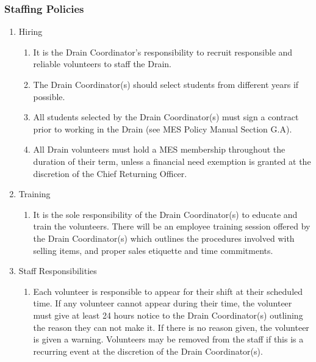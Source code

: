 \subsubsection{Staffing Policies}
\label{staffing-policies}

\begin{enumerate}
 \item
  Hiring

  \begin{enumerate}
   \item
    It is the Drain Coordinator's responsibility to recruit responsible and reliable volunteers to staff the Drain.
   \item
    The Drain Coordinator(s) should select students from different years if possible.
   \item
    All students selected by the Drain Coordinator(s) must sign a contract prior to working in the Drain (see MES Policy Manual Section G.A). %
   \item
    All Drain volunteers must hold a MES membership throughout the duration of their term, unless a financial need exemption is granted at the discretion of the Chief Returning Officer.
  \end{enumerate}
 \item
  Training

  \begin{enumerate}
   \item
    It is the sole responsibility of the Drain Coordinator(s) to educate and train the volunteers. There will be an employee training session offered by the Drain Coordinator(s) which outlines the procedures involved with selling items, and proper sales etiquette and time commitments.
  \end{enumerate}
 \item
  Staff Responsibilities

  \begin{enumerate}
   \item
    Each volunteer is responsible to appear for their shift at their scheduled time. If any volunteer cannot appear during their time, the volunteer must give at least 24 hours notice to the Drain Coordinator(s) outlining the reason they can not make it. If there is no reason given, the volunteer is given a warning. Volunteers may be removed from the staff if this is a recurring event at the discretion of the Drain Coordinator(s).
  \end{enumerate}
\end{enumerate}

